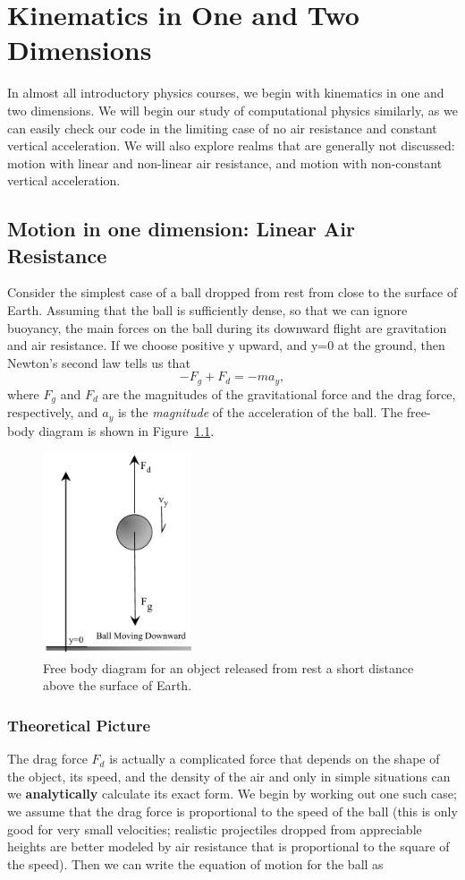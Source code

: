 %
\chapter{Kinematics in One and Two Dimensions}
\label{ch-kinematics} %
In almost all introductory physics courses, we begin with kinematics in one and two dimensions. We will begin our study of computational physics similarly, as we can easily check our code in the limiting case of no air resistance and constant vertical acceleration. We will also explore realms that are generally not discussed: motion with linear and non-linear air resistance, and motion with non-constant vertical acceleration. 
\section{Motion in one dimension: Linear Air Resistance}
\label{sec-1d}
Consider the simplest case of a ball dropped from rest from close to the surface of Earth. Assuming that the ball is sufficiently dense, so that we can ignore buoyancy, the main forces on the ball during its downward flight are gravitation and air resistance. If we choose positive y upward, and y=0 at the ground, then Newton's second law tells us that 
$$ - F_g + F_d = - m a_y ,$$
where $F_g$ and $F_d$ are the magnitudes of the gravitational force and the drag force, respectively, and $a_y$ is the \textit{magnitude} of the acceleration of the ball. The free-body diagram is shown in  Figure~\ref{fig-FreeFall}. 
\begin{figure}
\centering
\includegraphics[height=6cm]{Figures/5Kinematics/FreeFallDown}
\caption{Free body diagram for an object released from rest a short distance above the surface of Earth.}
\label{fig-FreeFall}       %
\end{figure}
\subsection{Theoretical Picture}
\label{sec-LinDragTheory}
The drag force $F_d$ is actually a complicated force that depends on the shape of the object, its speed, and the density of the air and only in simple situations can we \textbf{analytically} calculate its exact form. We begin by working out one such case; we assume that the drag force is proportional to the speed of the ball (this is only good for very small velocities; realistic projectiles dropped from appreciable heights are better modeled by air resistance that is proportional to the square of the speed). Then we can write the equation of motion for the ball as 

